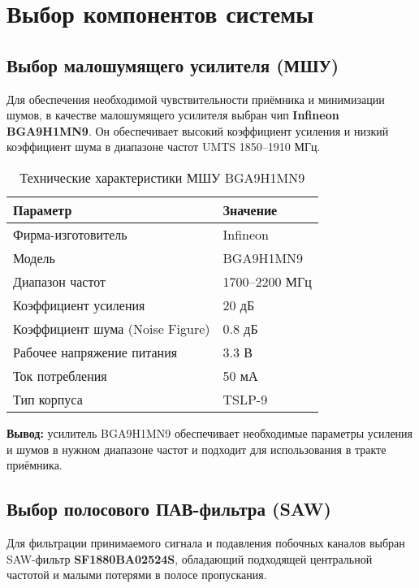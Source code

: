 \documentclass[a4paper,12pt]{article}
\begin{document}
\newpage

\section{Выбор компонентов системы}

\subsection{Выбор малошумящего усилителя (МШУ)}

Для обеспечения необходимой чувствительности приёмника и минимизации шумов, в качестве малошумящего усилителя выбран чип \textbf{Infineon BGA9H1MN9}. Он обеспечивает высокий коэффициент усиления и низкий коэффициент шума в диапазоне частот UMTS 1850–1910 МГц.

\begin{table}[H]
\centering
\caption{Технические характеристики МШУ BGA9H1MN9}
\begin{tabular}{|l|l|}
\hline
\textbf{Параметр} & \textbf{Значение} \\ \hline
Фирма-изготовитель & Infineon \\ \hline
Модель & BGA9H1MN9 \\ \hline
Диапазон частот & 1700–2200 МГц \\ \hline
Коэффициент усиления & 20 дБ \\ \hline
Коэффициент шума (Noise Figure) & 0.8 дБ \\ \hline
Рабочее напряжение питания & 3.3 В \\ \hline
Ток потребления & 50 мА \\ \hline
Тип корпуса & TSLP-9 \\ \hline
\end{tabular}
\end{table}

\textbf{Вывод:} усилитель BGA9H1MN9 обеспечивает необходимые параметры усиления и шумов в нужном диапазоне частот и подходит для использования в тракте приёмника.

\subsection{Выбор полосового ПАВ-фильтра (SAW)}

Для фильтрации принимаемого сигнала и подавления побочных каналов выбран SAW-фильтр \textbf{SF1880BA02524S}, обладающий подходящей центральной частотой и малыми потерями в полосе пропускания.
\end{document}
